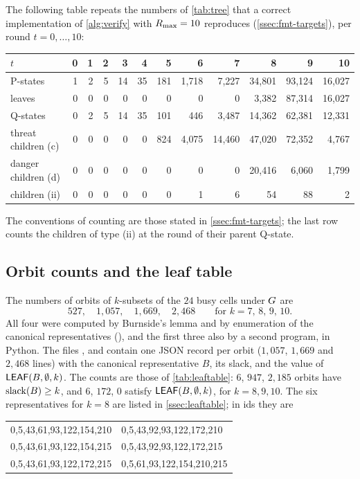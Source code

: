 The following table repeats the numbers of \cref{tab:tree} that a correct implementation of
\cref{alg:verify} with $R_{\max}=10$ reproduces (\cref{ssec:fmt-targets}), per round $t=0,\dots,10$:
\begin{center}\footnotesize\setlength{\tabcolsep}{3.2pt}
\begin{tabular}{@{}lrrrrrrrrrrr@{}}
\toprule
$t$ & 0 & 1 & 2 & 3 & 4 & 5 & 6 & 7 & 8 & 9 & 10\\
\midrule
P-states & 1 & 2 & 5 & 14 & 35 & 181 & 1{,}718 & 7{,}227 & 34{,}801 & 93{,}124 & 16{,}027\\
leaves & 0 & 0 & 0 & 0 & 0 & 0 & 0 & 0 & 3{,}382 & 87{,}314 & 16{,}027\\
Q-states & 0 & 2 & 5 & 14 & 35 & 101 & 446 & 3{,}487 & 14{,}362 & 62{,}381 & 12{,}331\\
threat children (c) & 0 & 0 & 0 & 0 & 0 & 824 & 4{,}075 & 14{,}460 & 47{,}020 & 72{,}352 & 4{,}767\\
danger children (d) & 0 & 0 & 0 & 0 & 0 & 0 & 0 & 0 & 20{,}416 & 6{,}060 & 1{,}799\\
\VOID{} children (ii) & 0 & 0 & 0 & 0 & 0 & 0 & 1 & 6 & 54 & 88 & 2\\
\bottomrule
\end{tabular}
\end{center}
The conventions of counting are those stated in \cref{ssec:fmt-targets}; the last row counts the \VOID{}
children of type (ii) at the round of their parent Q-state.

\subsection{Orbit counts and the leaf table}\label{ssec:fmt-orbits}

The numbers of orbits of $k$-subsets of the $24$ busy cells under $G$ are
\[
527,\quad 1{,}057,\quad 1{,}669,\quad 2{,}468\qquad\text{for } k=7,\,8,\,9,\,10 .
\]
All four were computed by Burnside's lemma and by enumeration of the canonical representatives
(), and the first three also by a second program, in Python. The files
,  and  contain one JSON record per
orbit ($1{,}057$, $1{,}669$ and $2{,}468$ lines) with the canonical representative $B$, its slack, and the value of
$\mathsf{LEAF}(B,\emptyset,k)$. The counts are those of \cref{tab:leaftable}:
$6$, $947$, $2{,}185$ orbits have $\operatorname{slack}(B)\ge k$, and $6$, $172$, $0$ satisfy $\mathsf{LEAF}(B,\emptyset,k)$, for
$k=8,9,10$. The six representatives for $k=8$ are listed in \cref{ssec:leaftable}; in ids they are
\begin{center}\small\ttfamily
\begin{tabular}{@{}ll@{}}
0,5,43,61,93,122,154,210 & 0,5,43,92,93,122,172,210\\
0,5,43,61,93,122,154,215 & 0,5,43,92,93,122,172,215\\
0,5,43,61,93,122,172,215 & 0,5,61,93,122,154,210,215
\end{tabular}
\end{center}

